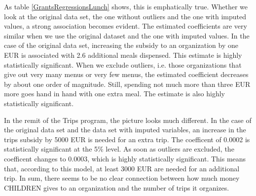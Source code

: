 \documentclass[12pt, a4paper, titlepage]{article}\usepackage[]{graphicx}\usepackage[]{color}
\begin{document}
As table \ref{GrantsRegressionsLunch} shows, this is emphatically true. Whether we look at the original data set, the one without outliers and the one with imputed values, a strong association becomes evident. 
The estimated coefficients are very similar when we use the original dataset and the one with imputed values. In the case of the original data set, increasing the subsidy to an organization by one EUR is associated with 2.6 additional meals dispensed. This estimate is highly statistically significant. When we exclude outliers, i.e. those organizations that give out very many menus or very few menus,
the estimated coefficient decreases by about one order of magnitude. Still, spending not much more than three EUR more goes hand in hand with one extra meal. The estimate is also highly statistically significant.

In the remit of the Trips program, the picture looks much different. In the case of the original data set and the data set with imputed variables, an increase in the trips subsidy by 5000 EUR is needed for an extra trip. The coefficent of 0.0002 is statistically significant at the 5\% level. As soon as outliers are excluded, the coefficent changes to 0.0003, which is highly statistically significant. This means that, according to this model, at least 3000 EUR are needed for an additional trip.
In sum, there seems to be no clear connection between how much money CHILDREN gives to an organization and the number of trips it organizes. 
\end{document}

